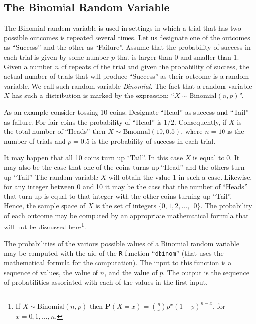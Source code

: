 \documentclass[]{krantz}
\newcommand{\Prob}{\mathbf{P}}
\theoremstyle{definition}
\theoremstyle{definition}
\theoremstyle{definition}
\theoremstyle{remark}
\begin{document}
\hypertarget{the-binomial-random-variable}{%
\subsection{The Binomial Random Variable}\label{the-binomial-random-variable}}

The Binomial random variable is used in settings in which a trial that
has two possible outcomes is repeated several times. Let us designate
one of the outcomes as ``Success'' and the other as ``Failure''. Assume that
the probability of success in each trial is given by some number \(p\)
that is larger than 0 and smaller than 1. Given a number \(n\) of repeats
of the trial and given the probability of success, the actual number of
trials that will produce ``Success'' as their outcome is a random
variable. We call such random variable \emph{Binomial}. The fact that a
random variable \(X\) has such a distribution is marked by the expression:
``\(X \sim \mathrm{Binomial}(n,p)\)''.

As an example consider tossing 10 coins. Designate ``Head'' as success and
``Tail'' as failure. For fair coins the probability of ``Head'' is \(1/2\).
Consequently, if \(X\) is the total number of ``Heads'' then
\(X \sim \mathrm{Binomial}(10,0.5)\), where \(n=10\) is the number of trials
and \(p=0.5\) is the probability of success in each trial.

It may happen that all 10 coins turn up ``Tail''. In this case \(X\) is
equal to 0. It may also be the case that one of the coins turns up
``Head'' and the others turn up ``Tail''. The random variable \(X\) will
obtain the value 1 in such a case. Likewise, for any integer between 0
and 10 it may be the case that the number of ``Heads'' that turn up is
equal to that integer with the other coins turning up ``Tail''. Hence, the
sample space of \(X\) is the set of integers \(\{0, 1, 2, \ldots, 10\}\).
The probability of each outcome may be computed by an appropriate
mathematical formula that will not be discussed here\footnote{If \(X\sim \mathrm{Binomial}(n,p)\) then
  \(\Prob(X = x) = {n \choose x} p^x (1-p)^{n-x}\), for
  \(x = 0, 1, \ldots, n\).}.

The probabilities of the various possible values of a Binomial random
variable may be computed with the aid of the \texttt{R} function ``\texttt{dbinom}''
(that uses the mathematical formula for the computation). The input to
this function is a sequence of values, the value of \(n\), and the value
of \(p\). The output is the sequence of probabilities associated with each
of the values in the first input.
\end{document}
